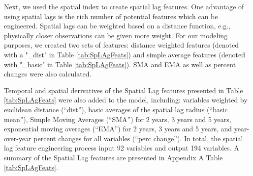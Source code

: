 \documentclass[12pt,]{article}
\begin{document}
Next, we used the spatial index to create spatial lag features. One
advantage of using spatial lags is the rich number of potential features
which can be engineered. Spatial lags can be weighted based on a
distance function, e.g., physically closer observations can be given
more weight. For our modeling purposes, we created two sets of features:
distance weighted features (denoted with a "\_dist" in Table
\ref{tab:SpLAgFeats}) and simple average features (denoted with
"\_basic" in Table \ref{tab:SpLAgFeats}). SMA and EMA as well as percent
changes were also calculated.

Temporal and spatial derivatives of the Spatial Lag features presented
in Table \ref{tab:SpLAgFeats} were also added to the model, including:
variables weighted by euclidean distance (``dist''), basic averages of
the spatial lag radius (``basic mean''), Simple Moving Averages
(``SMA'') for 2 years, 3 years and 5 years, exponential moving averages
(``EMA'') for 2 years, 3 years and 5 years, and year-over-year percent
changes for all variables (``perc change''). In total, the spatial lag
feature engineering process input 92 variables and output 194 variables.
A summary of the Spatial Lag features are presented in Appendix A Table
\ref{tab:SpLAgFeats}.
\end{document}
